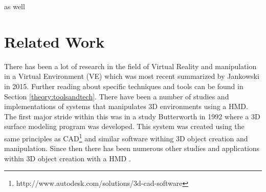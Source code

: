 as well\chapter{Related Work}
\label{relatedwork}
There has been a lot of research in the field of Virtual Reality and manipulation in a Virtual Environment (VE) which was most recent summarized by Jankowski in 2015\cite{interactions:Jankowski2015}. Further reading about specific techniques and tools can be found in Section \ref{theory:toolsandtech}. There have been a number of studies and implementations of systems that manipulates 3D environments using a HMD. The first major stride within this was in a study Butterworth in 1992 where a 3D surface modeling program was developed\cite{relatedwork:Butterworth1992}. This system was created using the same principles as CAD\footnote{http://www.autodesk.com/solutions/3d-cad-software} and similar software withing 3D object creation and manipulation. Since then there has been numerous other studies and applications within 3D object creation with a HMD\cite{relatedwork:bowman1996conceptual} \cite{relatedwork:moshell1995research} \cite{relatedwork:liang1994jdcad}.

